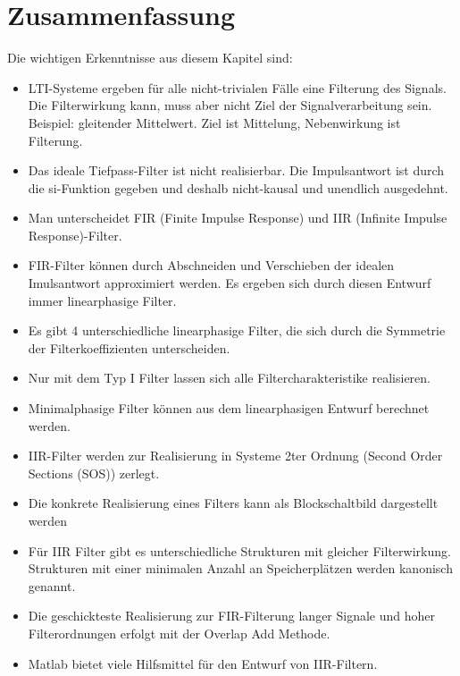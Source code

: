 {%
\section{Zusammenfassung}
Die wichtigen Erkenntnisse aus diesem Kapitel sind:
\begin{itemize}
    \item LTI-Systeme ergeben für alle nicht-trivialen Fälle eine Filterung des Signals. Die
    Filterwirkung kann, muss aber nicht Ziel der Signalverarbeitung sein. Beispiel: gleitender Mittelwert.
    Ziel ist Mittelung, Nebenwirkung ist Filterung.
    \item Das ideale Tiefpass-Filter ist nicht realisierbar. Die Impulsantwort ist durch die si-Funktion gegeben
    und deshalb nicht-kausal und unendlich ausgedehnt.
    \item Man unterscheidet FIR (Finite Impulse Response) und IIR (Infinite Impulse Response)-Filter.
    \item FIR-Filter können durch Abschneiden und Verschieben der idealen Imulsantwort approximiert werden. Es
    ergeben sich durch diesen Entwurf immer linearphasige Filter.
    \item Es gibt 4 unterschiedliche linearphasige Filter, die sich durch die Symmetrie der
    Filterkoeffizienten unterscheiden.
    \item Nur mit dem Typ I Filter lassen sich alle Filtercharakteristike realisieren.
    \item Minimalphasige Filter können aus dem linearphasigen Entwurf berechnet werden.
    \item IIR-Filter werden zur Realisierung in Systeme 2ter Ordnung (Second Order Sections (SOS))
    zerlegt.
    \item Die konkrete Realisierung eines Filters kann als Blockschaltbild dargestellt werden
    \item Für IIR Filter gibt es unterschiedliche Strukturen mit gleicher Filterwirkung.
    Strukturen mit einer minimalen Anzahl an Speicherplätzen werden kanonisch genannt.
    \item Die geschickteste Realisierung zur FIR-Filterung langer Signale und hoher Filterordnungen
    erfolgt mit der Overlap Add Methode.
    \item Matlab bietet viele Hilfsmittel für den Entwurf von IIR-Filtern.
\end{itemize}
}{} 